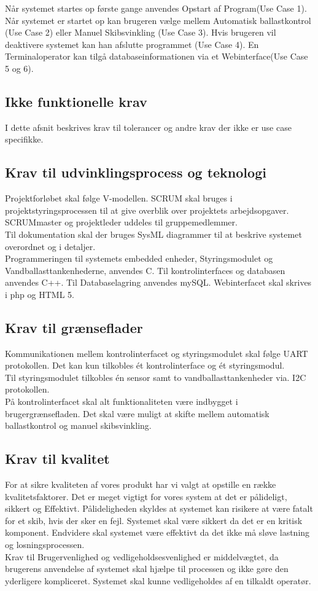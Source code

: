 Når systemet startes op første gange anvendes Opstart af Program(Use Case 1). Når systemet er startet op kan brugeren vælge mellem Automatisk ballastkontrol (Use Case 2) eller Manuel Skibsvinkling (Use Case 3). Hvis brugeren vil deaktivere systemet kan han afslutte programmet (Use Case 4). En Terminaloperator kan tilgå databaseinformationen via et Webinterface(Use Case 5 og 6).


\subsection{Ikke funktionelle krav}
I dette afsnit beskrives krav til tolerancer og andre krav der ikke er use case specifikke. 
\subsection{Krav til udvinklingsprocess og teknologi}
Projektforløbet skal følge V-modellen. SCRUM skal bruges i projektstyringsprocessen til at give overblik over projektets arbejdsopgaver. SCRUMmaster og projektleder uddeles til gruppemedlemmer.\\
Til dokumentation skal der bruges SysML diagrammer til at beskrive systemet overordnet og i detaljer.\\
Programmeringen til systemets embedded enheder, Styringsmodulet og Vandballasttankenhederne, anvendes C. Til kontrolinterfaces og databasen anvendes C++. Til Databaselagring anvendes mySQL. Webinterfacet skal skrives i php og HTML 5.

\subsection{Krav til grænseflader}
Kommunikationen mellem kontrolinterfacet og styringsmodulet skal følge UART protokollen. Det kan kun tilkobles ét kontrolinterface og ét styringsmodul.\\
Til styringsmodulet tilkobles én sensor samt to vandballasttankenheder via. I2C protokollen.\\
På kontrolinterfacet skal alt funktionaliteten være indbygget i brugergrænsefladen. Det skal være muligt at skifte mellem automatisk ballastkontrol og manuel skibsvinkling. 

\subsection{Krav til kvalitet}
For at sikre kvaliteten af vores produkt har vi valgt at opstille en række kvalitetsfaktorer. Det er meget vigtigt for vores system at det er pålideligt, sikkert og Effektivt. Pålideligheden skyldes at systemet kan risikere at være fatalt for et skib, hvis der sker en fejl. Systemet skal være sikkert da det er en kritisk komponent. Endvidere skal systemet være effektivt da det ikke må sløve lastning og losningsprocessen.\\
Krav til Brugervenlighed og vedligeholdsesvenlighed er middelvægtet, da brugerens anvendelse af systemet skal hjælpe til processen og ikke gøre den yderligere kompliceret. Systemet skal kunne vedligeholdes af en tilkaldt operatør.\\
